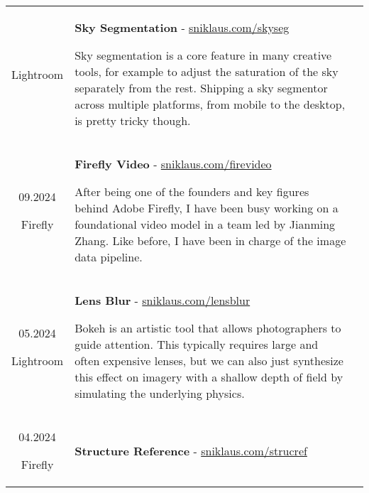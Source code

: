 \documentclass[10pt]{article}
\begin{document}
\begin{tabular}{C Z >{\setlength{\baselineskip}{0.9\baselineskip}}D}
{		\vspace{-0.05cm}
		
		{\scriptsize Lightroom}
	}
	&
	{
		{\bf Sky Segmentation} - \href{https://sniklaus.com/skyseg}{sniklaus.com/skyseg}
		
		\vspace{0.00cm}
		
		{\scriptsize Sky segmentation is a core feature in many creative tools, for example to adjust the saturation of the sky separately from the rest. Shipping a sky segmentor across multiple platforms, from mobile to the desktop, is pretty tricky though.}
		
		\vspace{0.0cm}
	}
	\\
	{
		09.2024
		
		\vspace{-0.05cm}
		
		{\scriptsize Firefly}
	}
	&
	{
		{\bf Firefly Video} - \href{https://sniklaus.com/firevideo}{sniklaus.com/firevideo}
		
		\vspace{0.00cm}
		
		{\scriptsize After being one of the founders and key figures behind Adobe Firefly, I have been busy working on a foundational video model in a team led by Jianming Zhang. Like before, I have been in charge of the image data pipeline.}
		
		\vspace{0.0cm}
	}
	\\
	{
		05.2024
		
		\vspace{-0.05cm}
		
		{\scriptsize Lightroom}
	}
	&
	{
		{\bf Lens Blur} - \href{https://sniklaus.com/lensblur}{sniklaus.com/lensblur}
		
		\vspace{0.00cm}
		
		{\scriptsize Bokeh is an artistic tool that allows photographers to guide attention. This typically requires large and often expensive lenses, but we can also just synthesize this effect on imagery with a shallow depth of field by simulating the underlying physics.}
		
		\vspace{0.0cm}
	}
	\\
	{
		04.2024
		
		\vspace{-0.05cm}
		
		{\scriptsize Firefly}
	}
	&
	{
		{\bf Structure Reference} - \href{https://sniklaus.com/strucref}{sniklaus.com/strucref}
		
}
\end{tabular}
\end{document}
